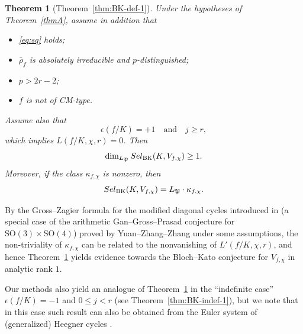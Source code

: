 \documentclass[10pt,letterpaper]{amsart}
\theoremstyle{plain}
\newtheorem{thm}{Theorem}[subsection] %
\theoremstyle{definition}
\newtheorem{rmk}[thm]{Remark}
\theoremstyle{definition}
\theoremstyle{plain}
\theoremstyle{plain}
\theoremstyle{plain}
\theoremstyle{remark}
\numberwithin{equation}{section}
\newcommand{\Sel}{Sel}
\def\Sel{{\rm Sel}}
\begin{document}
{\begin{thm}[Theorem~\ref{thm:BK-def-1}] %
\label{thmB}
Under the hypotheses of Theorem~\ref{thmA}, assume in addition  that
\begin{itemize}
    \item \eqref{eq:sq} holds;
    \item $\bar{\rho}_f$ is absolutely irreducible and $p$-distinguished;
    \item $p>2r-2$;
    \item $f$ is not of CM-type.
\end{itemize}
Assume also that
\[
\epsilon(f/K)=+1\quad\textrm{and}\quad j\geq r,
\]
which implies $L(f/K,\chi,r)=0$. Then 
%
%
\[
\dim_{L_\mathfrak{P}}\Sel_{\mathrm{BK}}(K,V_{f,\chi})\geq 1.
\] 
Moreover, if the class $\kappa_{f,\chi}$ 
is nonzero, then
\[
\Sel_{\mathrm{BK}}(K,V_{f,\chi})=L_\mathfrak{P}\cdot\kappa_{f,\chi}.
\]
\end{thm}

By the Gross--Zagier formula for the modified diagonal cycles introduced in \cite{gross-kudla,gross-schoen}
(a special case of the arithmetic Gan--Gross--Prasad conjecture for ${\mathrm{SO}}(3)\times\mathrm{SO}(4)$) proved by Yuan--Zhang--Zhang \cite{YZZ} under some assumptions, the non-triviality of $\kappa_{f,\chi}$ can be related to the nonvanishing of $L'(f/K,\chi,r)$, and hence Theorem~\ref{thmB} yields  evidence towards the Bloch--Kato conjecture for $V_{f,\chi}$ in analytic rank $1$. 

Our methods also yield an analogue of Theorem~\ref{thmB} in the 
``indefinite case'' $\epsilon(f/K)=-1$ and $0\leq j<r$ (see  Theorem~\ref{thm:BK-indef-1}), 
but we note that in this case such result can also be obtained from the Euler system of (generalized) Heegner cycles \cite{nekovar-invmath,cas-hsieh1}.


}
\end{document}

